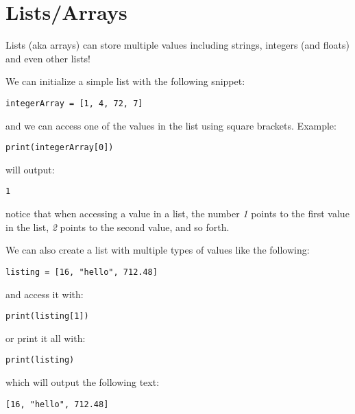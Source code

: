\section*{Lists/Arrays}
Lists (aka arrays) can store multiple values including strings, integers (and floats) and even other lists!

We can initialize a simple list with the following snippet:
\begin{lstlisting}
integerArray = [1, 4, 72, 7]
\end{lstlisting}
and we can access one of the values in the list using square brackets.
Example:
\begin{lstlisting}
print(integerArray[0])
\end{lstlisting}
will output:
\begin{lstlisting}[language=Text]
1
\end{lstlisting}
notice that when accessing a value in a list, the number \emph{1} points to the first value in the list,
\emph{2} points to the second value, and so forth.


We can also create a list with multiple types of values like the following:
\begin{lstlisting}
listing = [16, "hello", 712.48]
\end{lstlisting}
and access it with:
\begin{lstlisting}
print(listing[1])
\end{lstlisting}
or print it all with:
\begin{lstlisting}
print(listing)
\end{lstlisting}
which will output the following text:
\begin{lstlisting}[language=Text]
[16, "hello", 712.48]
\end{lstlisting}


